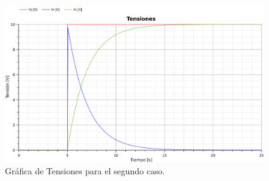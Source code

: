 \begin{figure}[H]
  \centering
  \label{gr:caso1:tensiones}
  \includegraphics[width=\textwidth]{modelica/graficas/2-tensiones}
  \caption{Gráfica de Tensiones para el segundo caso.}
\end{figure}
